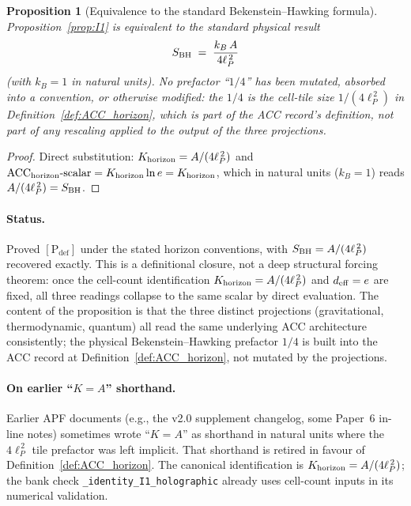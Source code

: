 \documentclass[11pt]{article}
\theoremstyle{plain}
\newtheorem{proposition}[theorem]{Proposition}
\theoremstyle{definition}
\theoremstyle{remark}
\begin{document}
\begin{proposition}[Equivalence to the standard Bekenstein--Hawking formula]\label{prop:I1_BH_equivalence}
Proposition~\ref{prop:I1} is equivalent to the standard physical result
\[
  S_{\rm BH} \;=\; \frac{k_B\, A}{4\ell_P^{\,2}}
\]
(with $k_B = 1$ in natural units).  No prefactor ``$1/4$'' has been mutated, absorbed into a convention, or otherwise modified: the $1/4$ is the cell-tile size $1/(4\ell_P^{\,2})$ in Definition~\ref{def:ACC_horizon}, which is part of the ACC record's definition, not part of any rescaling applied to the output of the three projections.
\end{proposition}

\begin{proof}
Direct substitution: $K_{\rm horizon} = A/(4\ell_P^{\,2})$ and $\mathrm{ACC}_{\rm horizon}\text{-scalar} = K_{\rm horizon} \ln e = K_{\rm horizon}$, which in natural units ($k_B = 1$) reads $A/(4\ell_P^{\,2}) = S_{\rm BH}$.
\end{proof}

\paragraph{Status.}
Proved $[\text{P}_{\mathrm{def}}]$ under the stated horizon conventions, with $S_{\rm BH} = A/(4\ell_P^{\,2})$ recovered exactly.  This is a definitional closure, not a deep structural forcing theorem: once the cell-count identification $K_{\rm horizon} = A/(4\ell_P^{\,2})$ and $d_{\rm eff} = e$ are fixed, all three readings collapse to the same scalar by direct evaluation.  The content of the proposition is that the three distinct projections (gravitational, thermodynamic, quantum) all read the same underlying ACC architecture consistently; the physical Bekenstein--Hawking prefactor $1/4$ is built into the ACC record at Definition~\ref{def:ACC_horizon}, not mutated by the projections.

\paragraph{On earlier ``$K = A$'' shorthand.}  Earlier APF documents (e.g., the v2.0 supplement changelog, some Paper~6 in-line notes) sometimes wrote ``$K = A$'' as shorthand in natural units where the $4\ell_P^{\,2}$ tile prefactor was left implicit.  That shorthand is retired in favour of Definition~\ref{def:ACC_horizon}.  The canonical identification is $K_{\rm horizon} = A/(4\ell_P^{\,2})$; the bank check \texttt{\_identity\_I1\_holographic} already uses cell-count inputs in its numerical validation.
\end{document}
